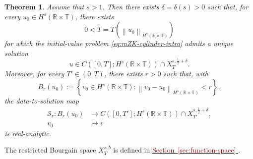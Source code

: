 \documentclass[12pt,oneside,reqno]{amsart}
\newcommand{\secref}[1]{%
    \hyperref[#1]{%
        \textcolor{Maroon}{Section~\ref*{#1}}%
    }%
}
\numberwithin{equation}{section}
\theoremstyle{plain}
\newtheorem{theorem}{Theorem}[section]
\def\R{{\mathbb R}}
\def\T{{\mathbb T}}
\newcommand{\norm}[1]{%
    \left\lVert #1\right\rVert%
}
\newcommand{\prc}[1]{%
    \left(#1\right)
}
\newcommand{\brs}[1]{%
    \left\{#1\right\}
}
\begin{document}
\begin{theorem}
\label{MainResult}
Assume that $s>1$. Then there exists $\delta=\delta(s)>0$ such that, for
every $u_0\in H^s(\R\times\T)$, there exists
\begin{equation*}
    0<T=T\prc{\norm{u_0}_{H^s(\R\times\T)}}
\end{equation*}
for which the initial-value problem
\eqref{eq:mZK-cylinder-intro} admits a unique solution
\begin{equation*}
    u\in
    C\prc{[0,T];H^s(\R\times\T)}
    \cap
    X_T^{s,\frac12+\delta}.
\end{equation*}
Moreover, for every $T'\in(0,T)$, there exists $r>0$ such that, with
\begin{equation*}
    B_r(u_0)
    :=
    \brs{
        v_0\in H^s(\R\times\T):
        \norm{v_0-u_0}_{H^s(\R\times\T)}<r
    },
\end{equation*}
the data-to-solution map
\begin{equation*}
\begin{aligned}
    \mathcal S_r:
    B_r(u_0)
    &\longrightarrow
    C\prc{[0,T'];H^s(\R\times\T)}
    \cap
    X_{T'}^{s,\frac12+\delta},
    \\
    v_0
    &\longmapsto
    v
\end{aligned}
\end{equation*}
is real-analytic.
\end{theorem}

The restricted Bourgain space $X_T^{s,b}$ is defined in \secref{sec:function-space}.
\end{document}
